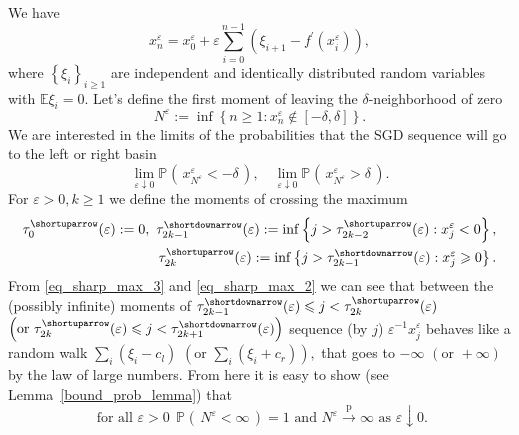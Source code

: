 \documentclass{article}
\theoremstyle{plain}
\theoremstyle{definition}
\theoremstyle{remark}
\newcommand{\p}[2][]{{\mathbb{P}}_{#1} \left( \, #2 \, \right) } %
\newcommand{\pra}{ \overset{\mathrm{p}}{\longrightarrow}} %
\begin{document}
We have
\begin{equation}\label{eq_sharp_max_2}
x_n^{\varepsilon}= x_0^{\varepsilon}  + \varepsilon \sum_{i=0}^{n-1}\left(\xi_{i+1}-f^{\prime}\left(x_i^{\varepsilon}\right)\right),
\end{equation}
where $\left\{\xi_i\right\}_{i \geqslant 1}$ are independent and identically distributed  random variables with $\mathbb{E} \xi_i=0$.
Let's define the first moment of leaving the $\delta$-neighborhood of zero
$$
N^{\varepsilon}:=\inf \left\{n \geqslant 1: x_n^{\varepsilon} \notin[-\delta, \delta]\right\}. 
$$
 We are interested in the limits of the probabilities that the SGD sequence will go to the left or right basin 
\begin{equation}\label{eq_sharp_max_9}
    \lim\limits_{\varepsilon\downarrow 0 } \p{x_{N^{\varepsilon}}^{\varepsilon} < -\delta},  \quad \lim\limits_{\varepsilon\downarrow 0 } \p{x_{N^{\varepsilon}}^{\varepsilon} > \delta}.
\end{equation}
For $\varepsilon >0, k \geqslant 1$ we define the moments of crossing the maximum
\begin{equation*}
    \begin{split}
        \tau_0^{\shortuparrow}(\varepsilon):=0, \ 
        \tau_{2 k-1}^{\shortdownarrow}(\varepsilon):=\inf \left\{j>\tau_{2k-2}^{\shortuparrow}(\varepsilon): x_j^{\varepsilon}<0\right\}, \\
        \tau_{2 k}^{\shortuparrow}(\varepsilon):=\inf \left\{j>\tau_{2 k-1}^{\shortdownarrow}(\varepsilon): x_j^{\varepsilon} \geqslant 0\right\}.
    \end{split}
\end{equation*}
From \eqref{eq_sharp_max_3} and \eqref{eq_sharp_max_2} we can see that between the (possibly infinite) moments of $\tau_{2 k-1}^{\shortdownarrow}(\varepsilon) \leqslant j < \tau_{2 k}^{\shortuparrow}(\varepsilon)$ $\left( \text{or } \tau_{2 k}^{\shortuparrow}(\varepsilon) \leqslant j < \tau_{2 k+1}^{\shortdownarrow}(\varepsilon)\right)$ sequence (by $j$) $\varepsilon^{-1} x_j^{\varepsilon}$ behaves like a random walk $
\sum_{i} (\xi_i - c_l)$  $\left(\text{or } \sum_{i} (\xi_i +c_r)\right),$ that goes to $-\infty$ $(\text{or } +\infty)$  by the law of large numbers. From here it is easy to show (see Lemma~\ref{bound_prob_lemma}) that 
\begin{equation*}
\text{ for all } \varepsilon>0 \ \ \p{N^{\varepsilon}<\infty} = 1   \text{ and } N^{\varepsilon} \pra \infty \text{ as }  \varepsilon\downarrow 0.
\end{equation*}
%
\end{document}
